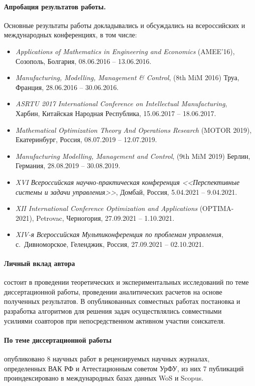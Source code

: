 \paragraph*{Апробация результатов работы.}
Основные результаты работы докладывались и обсуждались на всероссийских и международных конференциях, в том числе:

\begin{itemize}
    \item
    \textit{Applications of Mathematics in Engineering and Economics}
    (AMEE'16),
    Созополь, Болгария,
    08.06.2016 -- 13.06.2016.
    \item
    \textit{Manufacturing, Modelling, Management \& Control},
    (8th MiM 2016)
    Труа, Франция,
    28.06.2016 -- 30.06.2016.
    \item
    \textit{ASRTU 2017 International Conference on Intellectual Manufacturing},
    Харбин, Китайская Народная Республика,
    15.06.2017 -- 18.06.2017.
    \item
    \textit{Mathematical Optimization Theory And Operations Research}
    (MOTOR 2019),
    Екатеринбург, Россия,
    08.07.2019 -- 12.07.2019.
    \item
    \textit{Manufacturing Modelling, Management and Control},
    (9th MiM 2019)
    Берлин, Германия,
    28.08.2019 -- 30.08.2019.
    \item
    \textit{XVI Всероссийская научно-практическая конференция
    <<Перспективные системы и задачи управления>>},
    Домбай, Россия,
    5.04.2021 -- 9.04.2021.
    \item
    \textit{XII International Conference Optimization and Applications}
    (OPTIMA-2021),
    Petrovac, Черногория,
    27.09.2021 -- 1.10.2021.
    \item
    \textit{XIV-я Всероссийская Мультиконференция по проблемам управления},
    с.~Дивноморское, Геленджик, Россия,
    27.09.2021 -- 02.10.2021.
\end{itemize}

\paragraph*{Личный вклад автора}
состоит в проведении теоретических и экспериментальных исследований
по теме диссертационной работы,
проведении аналитических расчетов на основе полученных результатов.
В опубликованных совместных работах постановка и разработка алгоритмов для
решения задач осуществлялись совместными усилиями соавторов
при непосредственном активном участии соискателя.

\paragraph*{По теме диссертационной работы}
опубликовано
8 научных работ
в рецензируемых научных журналах,
определенных ВАК РФ и
Аттестационным советом УрФУ,
из них
7 публикаций проиндексировано в международных базах данных
WoS и Scopus.
